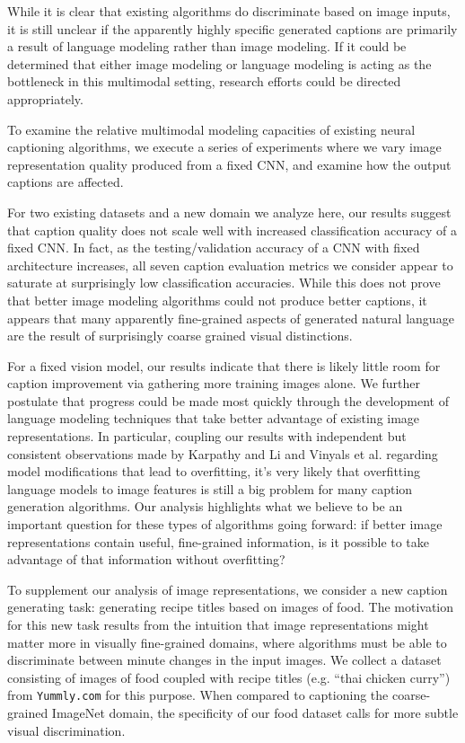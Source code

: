 \documentclass[11pt]{article}
\begin{document}
While it is clear that existing algorithms do discriminate based on
image inputs, it is still unclear if the apparently highly specific
generated captions are primarily a result of language modeling rather
than image modeling. If it could be determined that either image
modeling or language modeling is acting as the bottleneck in this
multimodal setting, research efforts could be directed
appropriately.

To examine the relative multimodal modeling capacities of existing
neural captioning algorithms, we execute a series of experiments where
we vary image representation quality produced from a fixed CNN, and
examine how the output captions are affected.

For two existing datasets and a new domain we analyze here, our
results suggest that caption quality does not scale well with
increased classification accuracy of a fixed CNN. In fact, as the
testing/validation accuracy of a CNN with fixed architecture
increases, all seven caption evaluation metrics we consider appear to
saturate at surprisingly low classification accuracies. While this
does not prove that better image modeling algorithms could not produce
better captions, it appears that many apparently fine-grained aspects
of generated natural language are the result of surprisingly coarse
grained visual distinctions.

For a fixed vision model, our results indicate that there is likely
little room for caption improvement via gathering more training images
alone. We further postulate that progress could be made most quickly
through the development of language modeling techniques that take
better advantage of existing image representations. In particular,
coupling our results with independent but consistent observations made
by Karpathy and Li  and Vinyals et
al.  regarding model modifications that
lead to overfitting, it's very likely that overfitting language models
to image features is still a big problem for many caption generation
algorithms. Our analysis highlights what we believe to be an important
question for these types of algorithms going forward: if better image
representations contain useful, fine-grained information, is it
possible to take advantage of that information without overfitting?

To supplement our analysis of image representations, we consider a new
caption generating task: generating recipe titles based on images of
food. The motivation for this new task results from the intuition that
image representations might matter more in visually fine-grained
domains, where algorithms must be able to discriminate between minute
changes in the input images. We collect a dataset consisting of images
of food coupled with recipe titles (e.g. ``thai chicken curry'') from
{\tt Yummly.com} for this purpose. When compared to captioning the
coarse-grained ImageNet domain, the specificity of our food dataset
calls for more subtle visual discrimination.
\end{document}
